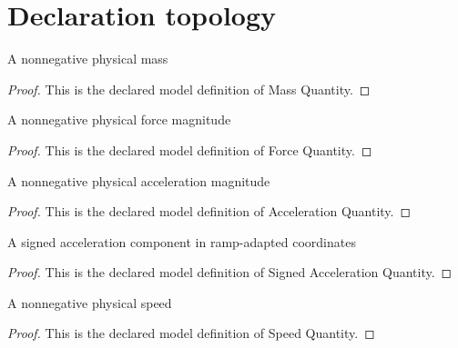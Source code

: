 \section{Declaration topology}
\begin{definition}
  \label{def:physics:phyx-mini-0759:phyxminiproblems-problemphyxmini0759-massquantity}
  A nonnegative physical mass
\end{definition}
\begin{proof}
  This is the declared model definition of Mass Quantity.
\end{proof}
\begin{definition}
  \label{def:physics:phyx-mini-0759:phyxminiproblems-problemphyxmini0759-forcequantity}
  A nonnegative physical force magnitude
\end{definition}
\begin{proof}
  This is the declared model definition of Force Quantity.
\end{proof}
\begin{definition}
  \label{def:physics:phyx-mini-0759:phyxminiproblems-problemphyxmini0759-accelerationquantity}
  A nonnegative physical acceleration magnitude
\end{definition}
\begin{proof}
  This is the declared model definition of Acceleration Quantity.
\end{proof}
\begin{definition}
  \label{def:physics:phyx-mini-0759:phyxminiproblems-problemphyxmini0759-signedaccelerationquantity}
  A signed acceleration component in ramp-adapted coordinates
\end{definition}
\begin{proof}
  This is the declared model definition of Signed Acceleration Quantity.
\end{proof}
\begin{definition}
  \label{def:physics:phyx-mini-0759:phyxminiproblems-problemphyxmini0759-speedquantity}
  A nonnegative physical speed
\end{definition}
\begin{proof}
  This is the declared model definition of Speed Quantity.
\end{proof}
